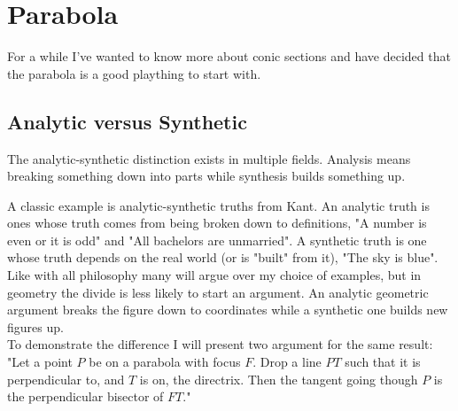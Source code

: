 
\section{Parabola}
For a while I've wanted to know more about conic sections and have decided that the parabola is a good plaything to start with.

\subsection{Analytic versus Synthetic}
The analytic-synthetic distinction exists in multiple fields.
Analysis means breaking something down into parts while synthesis builds something up.

A classic example is analytic-synthetic truths from Kant.
An analytic truth is ones whose truth comes from being broken down to definitions, "A number is even or it is odd" and "All bachelors are unmarried".
A synthetic truth is one whose truth depends on the real world (or is "built" from it), "The sky is blue".
\\

Like with all philosophy many will argue over my choice of examples,
but in geometry the divide is less likely to start an argument.
An analytic geometric argument breaks the figure down to coordinates while a synthetic one builds new figures up.
\\

To demonstrate the difference I will present two argument for the same result:
"Let a point $P$ be on a parabola with focus $F$.
Drop a line $PT$ such that it is perpendicular to, and $T$ is on, the directrix.
Then the tangent going though $P$ is the perpendicular bisector of $FT$."

\begin{center}
\end{center}

